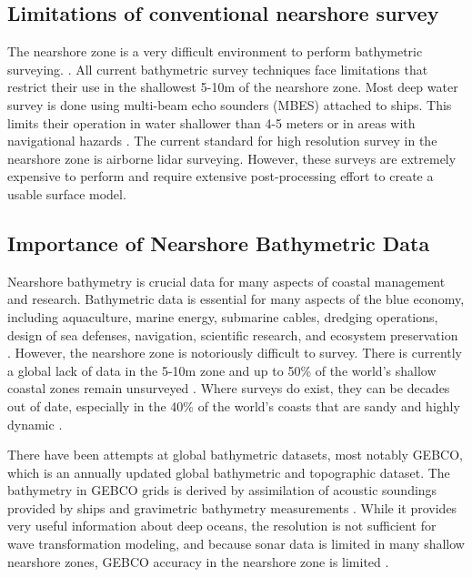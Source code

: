 \subsection{Limitations of conventional nearshore survey}

The nearshore zone is a very difficult environment to perform bathymetric surveying. \parencite{Parrish2019}. All current bathymetric survey techniques face limitations that restrict their use in the shallowest 5-10m of the nearshore zone. Most deep water survey is done using multi-beam echo sounders (MBES) attached to ships. This limits their operation in water shallower than 4-5 meters or in areas with navigational hazards \parencite{Cesbron2021,Monteys2015}. The current standard for high resolution survey in the nearshore zone is airborne lidar surveying. However, these surveys are extremely expensive to perform and require extensive post-processing effort to create a usable surface model.


\subsection{Importance of Nearshore Bathymetric Data}

Nearshore bathymetry is crucial data for many aspects of coastal management and research. Bathymetric data is essential for many aspects of the blue economy, including aquaculture, marine energy, submarine cables, dredging operations, design of sea defenses, navigation, scientific research, and ecosystem preservation \parencite{Cesbron2021,Ashphaq2021}. However, the nearshore zone is notoriously difficult to survey. There is currently a global lack of data in the 5-10m zone \parencite{Albright2021} and up to 50\% of the world's shallow coastal zones remain unsurveyed \parencite{IHO/OHI2022}. Where surveys do exist, they can be decades out of date, especially in the 40\% of the world's coasts that are sandy and highly dynamic \parencite{Almar2021e}.

There have been attempts at global bathymetric datasets, most notably GEBCO, which is an annually updated global bathymetric and topographic dataset. The bathymetry in GEBCO grids is derived by assimilation of acoustic soundings provided by ships and gravimetric bathymetry measurements \parencite{Cesbron2021}. While it provides very useful information about deep oceans, the resolution is not sufficient for wave transformation modeling, and because sonar data is limited in many shallow nearshore zones, GEBCO accuracy in the nearshore zone is limited \parencite{Monteys2015}.

